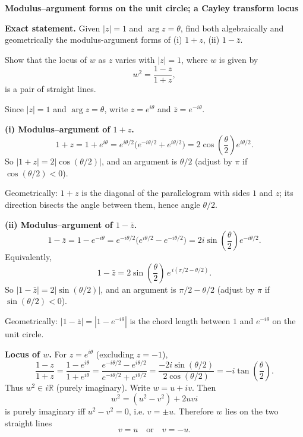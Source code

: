 \begin{problem}[CP-I-0064]
\label{prob:cp-i-0064}
\textbf{Modulus–argument forms on the unit circle; a Cayley transform locus}

\textbf{Exact statement.}
\hspace*{1.5em}Given \(|z|=1\) and \(\arg z=\theta\), find both algebraically and geometrically the modulus-argument forms of
(i) \(1+z\), (ii) \(1-\bar z\).

Show that the locus of \(w\) as \(z\) varies with \(|z|=1\), where \(w\) is given by
\[
w^2=\frac{1-z}{1+z},
\]
is a pair of straight lines.

\end{problem}

\begin{solution}
Since \(|z|=1\) and \(\arg z=\theta\), write \(z=e^{i\theta}\) and \(\bar z=e^{-i\theta}\).

\medskip
\noindent\textbf{(i) Modulus–argument of \(1+z\).}
\[
1+z=1+e^{i\theta}=e^{i\theta/2}\bigl(e^{-i\theta/2}+e^{i\theta/2}\bigr)
=2\cos\!\left(\frac\theta2\right)e^{i\theta/2}.
\]
So \(|1+z|=2\bigl|\cos(\theta/2)\bigr|\), and an argument is \(\theta/2\) (adjust by \(\pi\) if \(\cos(\theta/2)<0\)).

Geometrically: \(1+z\) is the diagonal of the parallelogram with sides \(1\) and \(z\); its direction bisects the angle between them, hence angle \(\theta/2\).

\medskip
\noindent\textbf{(ii) Modulus–argument of \(1-\bar z\).}
\[
1-\bar z = 1-e^{-i\theta}
= e^{-i\theta/2}\bigl(e^{i\theta/2}-e^{-i\theta/2}\bigr)
=2i\sin\!\left(\frac\theta2\right)e^{-i\theta/2}.
\]
Equivalently,
\[
1-\bar z = 2\sin\!\left(\frac\theta2\right)\,e^{\,i(\pi/2-\theta/2)}.
\]
So \(|1-\bar z|=2\bigl|\sin(\theta/2)\bigr|\), and an argument is \(\pi/2-\theta/2\) (adjust by \(\pi\) if \(\sin(\theta/2)<0\)).

Geometrically: \(|1-\bar z|=|1-e^{-i\theta}|\) is the chord length between \(1\) and \(e^{-i\theta}\) on the unit circle.

\medskip
\noindent\textbf{Locus of \(w\).}
For \(z=e^{i\theta}\) (excluding \(z=-1\)),
\[
\frac{1-z}{1+z}
=\frac{1-e^{i\theta}}{1+e^{i\theta}}
=\frac{e^{-i\theta/2}-e^{i\theta/2}}{e^{-i\theta/2}+e^{i\theta/2}}
=\frac{-2i\sin(\theta/2)}{2\cos(\theta/2)}
=-i\tan\!\left(\frac\theta2\right).
\]
Thus \(w^2\in i\mathbb{R}\) (purely imaginary). Write \(w=u+iv\). Then
\[
w^2=(u^2-v^2)+2uvi
\]
is purely imaginary iff \(u^2-v^2=0\), i.e. \(v=\pm u\). Therefore \(w\) lies on the two straight lines
\[
v=u \quad\text{or}\quad v=-u.
\]
\end{solution}

